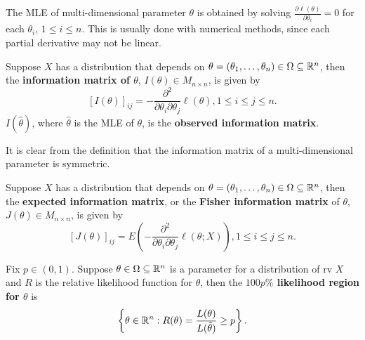 \documentclass[11pt,fleqn]{book} %
\begin{document}
\begin{remark} \label{rmk:614}
The MLE of multi-dimensional parameter \(\theta\) is obtained by solving \(\frac{\partial\ell(\theta)}{\partial\theta_i} = 0\) for each \(\theta_i\), \(1 \leq i \leq n\). This is usually done with numerical methods, since each partial derivative may not be linear.
\end{remark}

\begin{definition} \label{def:615}
Suppose \(X\) has a distribution that depends on \(\theta = (\theta_1, \ldots, \theta_n) \in \Omega \subseteq \mathbb{R}^n\), then the \textbf{information matrix of \(\theta\)}, \textbf{\(I(\theta) \in M_{n\times n}\)}, is given by
\[
[I(\theta)]_{ij} = -\frac{\partial^2}{\partial\theta_i\partial\theta_j} \ell(\theta), 1 \leq i \leq j \leq n.
\]
\indent \textbf{\(I(\hat{\theta})\)}, where \(\hat{\theta}\) is the MLE of \(\theta\), is the \textbf{observed information matrix}.
\end{definition}

\begin{remark} \label{rmk:616}
It is clear from the definition that the information matrix of a multi-dimensional parameter is symmetric.
\end{remark}

\begin{definition} \label{def:617}
Suppose \(X\) has a distribution that depends on \(\theta = (\theta_1, \ldots, \theta_n) \in \Omega \subseteq \mathbb{R}^n\), then the \textbf{expected information matrix}, or the \textbf{Fisher information matrix} of \(\theta\), \textbf{\(J(\theta) \in M_{n\times n}\)}, is given by
\[
[J(\theta)]_{ij} = E\left(-\frac{\partial^2}{\partial\theta_i\partial\theta_j}\ell(\theta; X)\right), 1 \leq i \leq j \leq n.
\]
\end{definition}

\begin{definition} \label{def:618}
Fix \(p \in (0, 1)\). Suppose \(\theta\in\Omega\subseteq\mathbb{R}^n\) is a parameter for a distribution of rv \(X\) and \(R\) is the relative likelihood function for \(\theta\), then the \textbf{\(100p\%\) likelihood region for \(\theta\)} is
\[
\left\{\theta \in \mathbb{R}^n: R(\theta) = \frac{L(\theta)}{L(\tilde{\theta})} \geq p\right\}.
\]
\end{definition}
\end{document}
